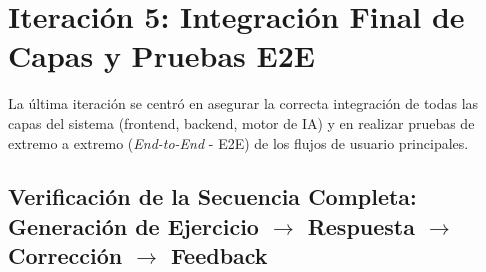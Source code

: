 
\section{Iteración 5: Integración Final de Capas y Pruebas E2E}
\label{sec:desarrollo_iter5_integration_e2e}

La última iteración se centró en asegurar la correcta integración de todas las capas del sistema (frontend, backend, motor de IA) y en realizar pruebas de extremo a extremo (\emph{End-to-End} - E2E) de los flujos de usuario principales.

\subsection{Verificación de la Secuencia Completa: Generación de Ejercicio \(\rightarrow\) Respuesta \(\rightarrow\) Corrección \(\rightarrow\) Feedback}
\label{ssec:desarrollo_iter5_full_flow}

